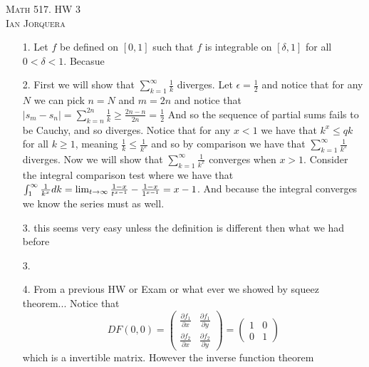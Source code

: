 \documentclass[12pt]{amsart}
\begin{document}
\begin{center}
   \textsc{Math 517. HW 3\\ Ian Jorquera}
\end{center}
\vspace{1em}

\begin{itemize}
   \item[1.] Let $f$ be defined on $[0,1]$ such that $f$ is integrable on $[\delta,1]$ for all $0<\delta<1$. %
            Becasue 

   \item[2.] First we will show that $\sum_{k=1}^\infty\frac{1}{k}$ diverges. Let $\epsilon=\frac{1}{2}$ 
   and notice that for any $N$ we can pick $n=N$ and $m=2n$ and notice that $|s_m-s_n|=\sum_{k=n}^{2n}\frac{1}{k}\geq \frac{2n-n}{2n}=\frac{1}{2}$
   And so the sequence of partial sums fails to be Cauchy, and so diverges.
   Notice that for any $x<1$ we have that $k^x\leq q k$ for all $k\geq 1$, meaning $\frac{1}{k} \leq \frac{1}{k^x}$ 
   and so by comparison we have that $\sum_{k=1}^\infty\frac{1}{k^x}$ diverges.
   Now we will show that $\sum_{k=1}^\infty\frac{1}{k^x}$ converges when $x>1$.
   Consider the integral comparison test where we have that $\int_1^\infty\frac{1}{k^x}dk=\lim_{t\rightarrow \infty}\frac{1-x}{t^{x-1}}-\frac{1-x}{1^{x-1}}=x-1$.
   And because the integral converges we know the series must as well.

   \item[3.] this seems very easy unless the definition is different then what we had before
   \item[3.] 
   \item[4. ] From a previous HW or Exam or what ever we showed by squeez theorem... Notice that 
   \[DF(0,0)= \begin{pmatrix}\frac{\partial f_1}{\partial x} & \frac{\partial f_1}{\partial y}\\ \frac{\partial f_2}{\partial x} & \frac{\partial f_2}{\partial y}\end{pmatrix}  = \begin{pmatrix}1 & 0\\ 0 & 1\end{pmatrix}\]
    which is a invertible matrix. However the inverse function theorem
\end{itemize}
\end{document}
